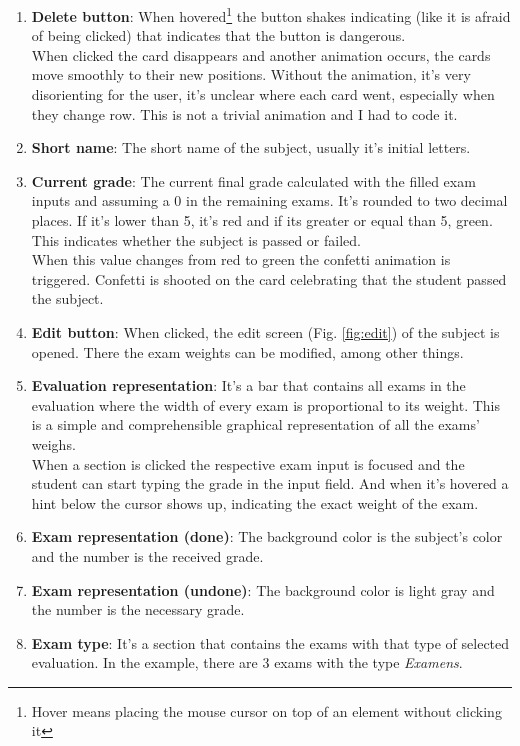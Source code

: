 \begin{enumerate}[itemsep=0mm]
    \item \textbf{Delete button}: When hovered\footnote{Hover means placing the mouse cursor on top of an element without clicking it} the button shakes indicating (like it is afraid of being clicked) that indicates that the button is dangerous. \\
    When clicked the card disappears and another animation occurs, the cards move smoothly to their new positions. Without the animation, it's very disorienting for the user, it's unclear where each card went, especially when they change row. This is not a trivial animation and I had to code it\cite{flex-animation}.
    \item \textbf{Short name}: The short name of the subject, usually it's initial letters.
    \item \textbf{Current grade}: The current final grade calculated with the filled exam inputs and assuming a 0 in the remaining exams. It's rounded to two decimal places. If it's lower than 5, it's red and if its greater or equal than 5, green. This indicates whether the subject is passed or failed. \\
    When this value changes from red to green the confetti animation is triggered. Confetti is shooted on the card celebrating that the student passed the subject.
    \item \textbf{Edit button}: When clicked, the edit screen (Fig. \ref{fig:edit}) of the subject is opened. There the exam weights can be modified, among other things.
    \item \textbf{Evaluation representation}: It's a bar that contains all exams in the evaluation where the width of every exam is proportional to its weight. This is a simple and comprehensible graphical representation of all the exams' weighs. \\
    When a section is clicked the respective exam input is focused and the student can start typing the grade in the input field. And when it's hovered a hint below the cursor shows up, indicating the exact weight of the exam. 
    \item \textbf{Exam representation (done)}: The background color is the subject's color and the number is the received grade.
    \item \textbf{Exam representation (undone)}: The background color is light gray and the number is the necessary grade. 
    \item \textbf{Exam type}: It's a section that contains the exams with that type of selected evaluation. In the example, there are 3 exams with the type \textit{Examens}. %

\end{enumerate}
